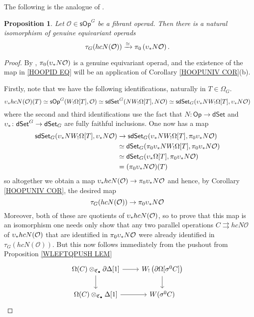 \documentclass[a4paper,10pt
,draft
]{article}%
\numberwithin{equation}{section}
\numberwithin{figure}{section}
\newtheorem{proposition}[equation]{Proposition}%
\theoremstyle{definition} %
\newcommand{\dSet}{\mathsf{dSet}}
\renewcommand{\O}{\ensuremath{\mathcal O}}
\newcommand{\1}{\ensuremath{\mathbbm 1}}%
\begin{document}
The following is the analogue of \cite[Prop. 4.8]{CM13b}.

\begin{proposition}\label{HOOPID_PROP}
Let $\mathcal{O} \in \mathsf{sOp}^G$
be a fibrant operad. 
Then there is a natural isomorphism of genuine equivariant operads
\begin{equation}\label{HOOPID EQ}
\tau_G(hcN(\mathcal{O})) \xrightarrow{\simeq}
\pi_0 \left( \upsilon_{\**} N\mathcal{O} \right).
\end{equation}
\end{proposition}


\begin{proof}
      By \cite[Prop. 5.9]{BP_edss}, $\pi_0(\upsilon_{\**}N\O)$ is a genuine equivariant operad,
      and the existence of the map in \eqref{HOOPID EQ}
      will be an application of
      Corollary \ref{HOOPUNIV COR}(b).

Firstly,
note that we have the following identifications,
naturally in $T \in \Omega_G$.
\[
\upsilon_{\**}hcN(\O)(T)
\simeq
\mathsf{sOp}^G(W_!\Omega[T],\O)
\simeq
\mathsf{sdSet}^G(N W_!\Omega[T],N \O)
\simeq 
\mathsf{sdSet}_G(\upsilon_{\**}N W_!\Omega[T],\upsilon_{\**}N \O)
\]
where the second and third identifications use the fact that 
$N\colon \mathsf{Op} \to \mathsf{dSet}$ and $\upsilon_{\**} \colon \dSet^G \to \dSet_G$
are fully faithful inclusions. 
One now has a map
\begin{align*}
  \mathsf{sdSet}_G(\upsilon_{\**}N W_!\Omega[T],\upsilon_{\**}N \O)
  & \to
    \mathsf{sdSet}_G(\upsilon_{\**}N W_!\Omega[T],\pi_0\upsilon_{\**}N \O)
  \\ & \simeq
       \mathsf{dSet}_G(\pi_0 \upsilon_{\**}  N W_!\Omega[T],\pi_0\upsilon_{\**}N \O)
  \\ & \simeq
       \mathsf{dSet}_G(\upsilon_{\**}\Omega[T],\pi_0\upsilon_{\**}N \O)
  \\ & =
       (\pi_0\upsilon_{\**}N \O)(T)
\end{align*}
so altogether we obtain a map
$\upsilon_{\**}hcN(\O) \to \pi_0 \upsilon_{\**} N \O$
and hence, by Corollary \ref{HOOPUNIV COR},
the desired map 
\[
	\tau_G(hcN(\O)) \to \pi_0 \upsilon_{\**} N \O
\]
Moreover, both of these are quotients of $\upsilon_{\**}hcN(\O)$,
so to prove that this map is an isomorphism one needs only show that any two parallel operations $C \rightrightarrows hcN \O$ of $\upsilon_{\**}hcN(\O)$
that are identified in 
$\pi_0 \upsilon_{\**} N \O$
were already identified in 
$\tau_G(hcN(\O))$.
But this now follows immediately from the pushout from Proposition \ref{WLEFTQPUSH LEM}
\[
\begin{tikzcd}
	\Omega(C) \otimes_{\mathfrak{C}_{\bullet}}
	\partial \Delta[1]
	\ar{r} \ar{d}
&
	W_! \left(\partial \Omega[\sigma^0 C]\right) 
	\ar{d}
\\
	\Omega(C) \otimes_{\mathfrak{C}_{\bullet}}
	\Delta[1]
	\ar{r}
&
	W(\sigma^0 C)
\end{tikzcd}
\]
\end{proof}










{}

\end{document}
